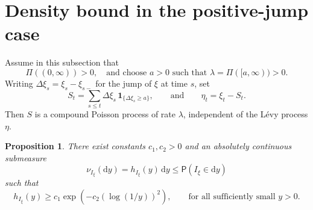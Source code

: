 \documentclass[11pt]{article}
\newtheorem{proposition}[theorem]{Proposition}
\newcommand{\Prob}{\mathsf P}
\newcommand{\1}{\mathbf 1}
\newcommand{\dd}{\mathrm d}
\begin{document}
\section{Density bound in the positive-jump case}
Assume in this subsection that
\[
 \Pi((0,\infty))>0,
 \quad \text{and choose $a>0$ such that }
 \lambda=\Pi([a,\infty))>0.
\]
Writing
$
 \Delta\xi_s=\xi_s-\xi_{s-}
$
for the jump of $\xi$ at time $s$, set
\[
 S_t=\sum_{s\leq t}\Delta\xi_s\,\1_{\{\Delta\xi_s\geq a\}},
 \qquad\text{and}\qquad
 \eta_t=\xi_t-S_t.
\]
Then $S$ is a compound Poisson process of rate $\lambda$, independent of the L\'evy process $\eta$. 


\begin{proposition}\label{prop:group}
There exist constants $c_1, c_2>0$ and an absolutely continuous submeasure
\[
 \nu_{I_\xi}(\dd y)=h_{I_\xi}(y)\,\dd y\leq \Prob(I_\xi\in\dd y)
\]
such that
\begin{equation}\label{eq:hI-lower}
 h_{I_\xi}(y)\geq c_1\exp \left(-c_2(\log(1/y))^2\right),
 \qquad
 \text{for all sufficiently small }y>0.
\end{equation}
\end{proposition}
\end{document}
